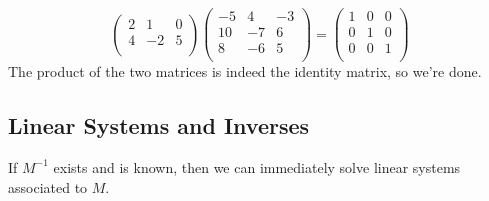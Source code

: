 \begin{example}
\[\begin{pmatrix}
2 & 1 & 0 \\
4 & -2 & 5 \\
\end{pmatrix}\begin{pmatrix}
-5 & 4 & -3 \\
10 & -7 & 6 \\
 8 & -6 & 5 \\
\end{pmatrix}
=\begin{pmatrix}
1 & 0 & 0 \\
0 & 1 & 0 \\
0 & 0 & 1 \\
\end{pmatrix}
\]  
The product of the two matrices is indeed the identity matrix, so we're done.
\end{example}

\subsection{Linear Systems and Inverses}

If $M^{-1}$ exists and is known, then we can immediately solve linear systems associated to $M$.

